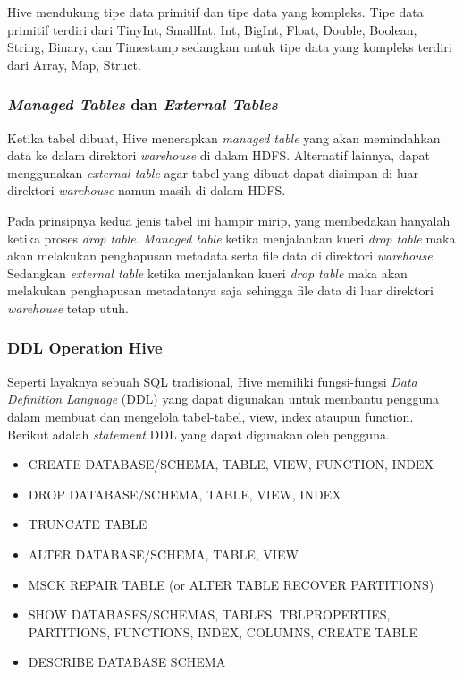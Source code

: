 Hive mendukung tipe data primitif dan tipe data yang kompleks. Tipe data primitif terdiri dari TinyInt, SmallInt, Int, BigInt, Float, Double, Boolean, String, Binary, dan Timestamp sedangkan untuk tipe data yang kompleks terdiri dari Array, Map, Struct.

\subsubsection{\textit{Managed Tables} dan \textit{External Tables}}
Ketika tabel dibuat, Hive menerapkan \textit{managed table} yang akan memindahkan data ke dalam direktori \textit{warehouse} di dalam HDFS. Alternatif lainnya, dapat menggunakan \textit{external table} agar tabel yang dibuat dapat disimpan di luar direktori \textit{warehouse} namun masih di dalam HDFS. 

Pada prinsipnya kedua jenis tabel ini hampir mirip, yang membedakan hanyalah ketika proses \textit{drop table}. \textit{Managed table} ketika menjalankan kueri \textit{drop table} maka akan melakukan penghapusan metadata serta file data di direktori \textit{warehouse}. Sedangkan \textit{external table} ketika menjalankan kueri \textit{drop table} maka akan melakukan penghapusan metadatanya saja sehingga file data di luar direktori \textit{warehouse} tetap utuh.

\subsubsection{DDL Operation Hive}
Seperti layaknya sebuah SQL tradisional, Hive memiliki fungsi-fungsi \textit{Data Definition Language} (DDL) yang dapat digunakan untuk membantu pengguna dalam membuat dan mengelola tabel-tabel, view, index ataupun function. Berikut adalah \textit{statement} DDL yang dapat digunakan oleh pengguna.

\begin{itemize}
	\item CREATE DATABASE/SCHEMA, TABLE, VIEW, FUNCTION, INDEX
	\item DROP DATABASE/SCHEMA, TABLE, VIEW, INDEX
	\item TRUNCATE TABLE
	\item ALTER DATABASE/SCHEMA, TABLE, VIEW
	\item MSCK REPAIR TABLE (or ALTER TABLE RECOVER PARTITIONS)
	\item SHOW DATABASES/SCHEMAS, TABLES, TBLPROPERTIES, PARTITIONS, FUNCTIONS, INDEX, COLUMNS, CREATE TABLE
	\item DESCRIBE DATABASE SCHEMA
\end{itemize}

